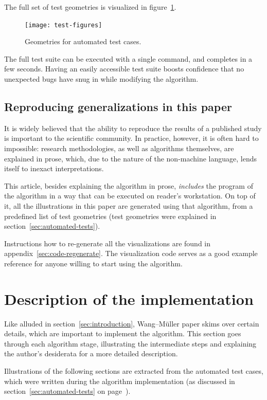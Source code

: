 \documentclass[a4paper]{article}
\newcommand{\onpage}[1]{\ref{#1} on page~\pageref{#1}}
\newcommand{\WM}{Wang--M{\"u}ller}
\begin{document}
The full set of test geometries is visualized in
figure~\ref{fig:test-figures}.

\begin{figure}[h]
    \centering
    \texttt{[image: test-figures]}
    \caption{Geometries for automated test cases.}
    \label{fig:test-figures}
\end{figure}

The full test suite can be executed with a single command, and completes in a
few seconds. Having an easily accessible test suite boosts confidence that no
unexpected bugs have snug in while modifying the algorithm.

\subsection{Reproducing generalizations in this paper}
\label{sec:reproducing-the-paper}

It is widely believed that the ability to reproduce the results of a published
study is important to the scientific community. In practice, however, it is
often hard to impossible: research methodologies, as well as algorithms
themselves, are explained in prose, which, due to the nature of the non-machine
language, lends itself to inexact interpretations.

This article, besides explaining the algorithm in prose, \emph{includes} the
program of the algorithm in a way that can be executed on reader's workstation.
On top of it, all the illustrations in this paper are generated using that
algorithm, from a predefined list of test geometries (test geometries were
explained in section~\ref{sec:automated-tests}).

Instructions how to re-generate all the visualizations are found in
appendix~\ref{sec:code-regenerate}. The visualization code serves as a good
example reference for anyone willing to start using the algorithm.

\section{Description of the implementation}

Like alluded in section~\ref{sec:introduction}, {\WM} paper skims over
certain details, which are important to implement the algorithm. This section
goes through each algorithm stage, illustrating the intermediate steps and
explaining the author's desiderata for a more detailed description.

Illustrations of the following sections are extracted from the automated test
cases, which were written during the algorithm implementation (as discussed in
section~\onpage{sec:automated-tests}).
\end{document}
